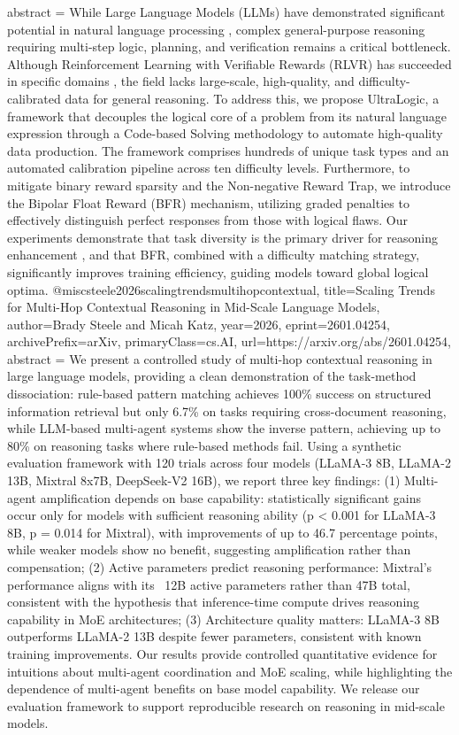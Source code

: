{      abstract = {While Large Language Models (LLMs) have demonstrated significant potential in natural language processing , complex general-purpose reasoning requiring multi-step logic, planning, and verification remains a critical bottleneck. Although Reinforcement Learning with Verifiable Rewards (RLVR) has succeeded in specific domains , the field lacks large-scale, high-quality, and difficulty-calibrated data for general reasoning. To address this, we propose UltraLogic, a framework that decouples the logical core of a problem from its natural language expression through a Code-based Solving methodology to automate high-quality data production. The framework comprises hundreds of unique task types and an automated calibration pipeline across ten difficulty levels. Furthermore, to mitigate binary reward sparsity and the Non-negative Reward Trap, we introduce the Bipolar Float Reward (BFR) mechanism, utilizing graded penalties to effectively distinguish perfect responses from those with logical flaws. Our experiments demonstrate that task diversity is the primary driver for reasoning enhancement , and that BFR, combined with a difficulty matching strategy, significantly improves training efficiency, guiding models toward global logical optima.}
}@misc{steele2026scalingtrendsmultihopcontextual,
      title={Scaling Trends for Multi-Hop Contextual Reasoning in Mid-Scale Language Models}, 
      author={Brady Steele and Micah Katz},
      year={2026},
      eprint={2601.04254},
      archivePrefix={arXiv},
      primaryClass={cs.AI},
      url={https://arxiv.org/abs/2601.04254},
      abstract = {We present a controlled study of multi-hop contextual reasoning in large language models, providing a clean demonstration of the task-method dissociation: rule-based pattern matching achieves 100\% success on structured information retrieval but only 6.7\% on tasks requiring cross-document reasoning, while LLM-based multi-agent systems show the inverse pattern, achieving up to 80\% on reasoning tasks where rule-based methods fail. Using a synthetic evaluation framework with 120 trials across four models (LLaMA-3 8B, LLaMA-2 13B, Mixtral 8x7B, DeepSeek-V2 16B), we report three key findings: (1) Multi-agent amplification depends on base capability: statistically significant gains occur only for models with sufficient reasoning ability (p < 0.001 for LLaMA-3 8B, p = 0.014 for Mixtral), with improvements of up to 46.7 percentage points, while weaker models show no benefit, suggesting amplification rather than compensation; (2) Active parameters predict reasoning performance: Mixtral's performance aligns with its ~12B active parameters rather than 47B total, consistent with the hypothesis that inference-time compute drives reasoning capability in MoE architectures; (3) Architecture quality matters: LLaMA-3 8B outperforms LLaMA-2 13B despite fewer parameters, consistent with known training improvements. Our results provide controlled quantitative evidence for intuitions about multi-agent coordination and MoE scaling, while highlighting the dependence of multi-agent benefits on base model capability. We release our evaluation framework to support reproducible research on reasoning in mid-scale models.}
}
